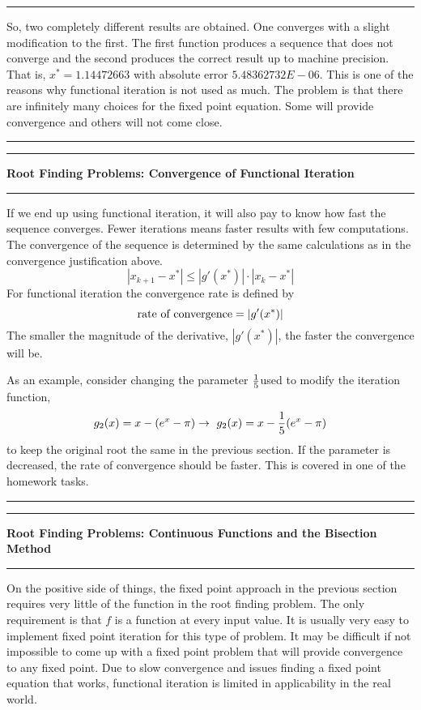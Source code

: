 \documentclass[10pt,fleqn]{article}
\begin{document}
\vskip0.1in\hrule\vskip0.1in
So, two completely different results are obtained. One converges with a slight
modification to the first. The first function produces a sequence that does not
converge and the second produces the correct result up to machine precision.
That is, $x^*=1.14472663$ with absolute error $5.48362732E-06$. This is one of
the reasons why functional iteration is not used as much. The problem is that
there are infinitely many choices for the fixed point equation. Some will
provide convergence and others will not come close.
\vskip0.1in\hrule\vskip0.1in
\newpage
\vskip0.1in\hrule\vskip0.1in
\noindent
{\bf Root Finding Problems: Convergence of Functional Iteration}
\vskip0.1in\hrule\vskip0.1in
\noindent
If we end up using functional iteration, it will also pay to know how fast the
sequence converges. Fewer iterations means faster results with few computations.
The convergence of the sequence is determined by the same calculations as in
the convergence justification above.
$$
  | x_{k+1} - x^* | \leq | g'(x^*) | \cdot| x_k - x^* |
$$
For functional iteration the convergence rate is defined by
$$
  \makebox{rate of convergence} = | g'(x^*) | 
$$
The smaller the magnitude of the derivative, $|g'(x^*)|$, the faster the
convergence will be.

As an example, consider changing the parameter ${1\over 5}$used to modify the
iteration function, 
$$
  g_2(x) = x - ( e^x - \pi ) \rightarrow\ g_2(x) = x - {1\over 5} ( e^x - \pi )
$$
to keep the original root the same in the previous section. If the parameter is
decreased, the rate of convergence should be faster. This is covered in one of
the homework tasks.
\vskip0.1in\hrule\vskip0.1in
\newpage
\vskip0.1in\hrule\vskip0.1in
\noindent
{\bf Root Finding Problems: Continuous Functions and the Bisection Method}
\vskip0.1in\hrule\vskip0.1in
\noindent
On the positive side of things, the fixed point approach in the previous section
requires very little of the function in the root finding problem. The only
requirement is that $f$ is a function at every input value. It is usually very
easy to implement fixed point iteration for this type of problem. It may be
difficult if not impossible to come up with a fixed point problem that will
provide convergence to any fixed point. Due to slow convergence and issues
finding a fixed point equation that works, functional iteration is limited in
applicability in the real world.
\end{document}
